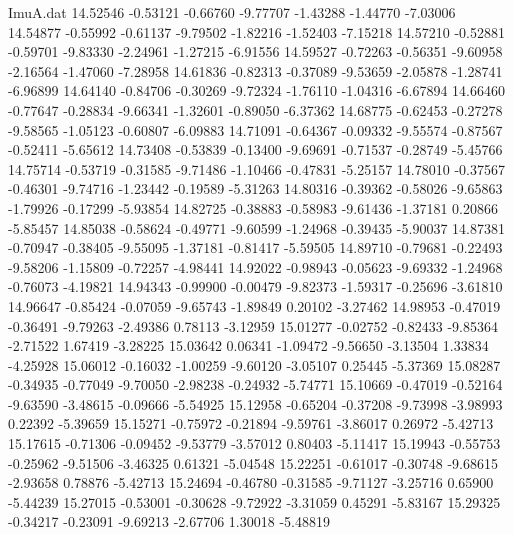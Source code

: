 \begin{filecontents}{ImuA.dat}
  14.52546   -0.53121   -0.66760   -9.77707   -1.43288   -1.44770   -7.03006
  14.54877   -0.55992   -0.61137   -9.79502   -1.82216   -1.52403   -7.15218
  14.57210   -0.52881   -0.59701   -9.83330   -2.24961   -1.27215   -6.91556
  14.59527   -0.72263   -0.56351   -9.60958   -2.16564   -1.47060   -7.28958
  14.61836   -0.82313   -0.37089   -9.53659   -2.05878   -1.28741   -6.96899
  14.64140   -0.84706   -0.30269   -9.72324   -1.76110   -1.04316   -6.67894
  14.66460   -0.77647   -0.28834   -9.66341   -1.32601   -0.89050   -6.37362
  14.68775   -0.62453   -0.27278   -9.58565   -1.05123   -0.60807   -6.09883
  14.71091   -0.64367   -0.09332   -9.55574   -0.87567   -0.52411   -5.65612
  14.73408   -0.53839   -0.13400   -9.69691   -0.71537   -0.28749   -5.45766
  14.75714   -0.53719   -0.31585   -9.71486   -1.10466   -0.47831   -5.25157
  14.78010   -0.37567   -0.46301   -9.74716   -1.23442   -0.19589   -5.31263
  14.80316   -0.39362   -0.58026   -9.65863   -1.79926   -0.17299   -5.93854
  14.82725   -0.38883   -0.58983   -9.61436   -1.37181    0.20866   -5.85457
  14.85038   -0.58624   -0.49771   -9.60599   -1.24968   -0.39435   -5.90037
  14.87381   -0.70947   -0.38405   -9.55095   -1.37181   -0.81417   -5.59505
  14.89710   -0.79681   -0.22493   -9.58206   -1.15809   -0.72257   -4.98441
  14.92022   -0.98943   -0.05623   -9.69332   -1.24968   -0.76073   -4.19821
  14.94343   -0.99900   -0.00479   -9.82373   -1.59317   -0.25696   -3.61810
  14.96647   -0.85424   -0.07059   -9.65743   -1.89849    0.20102   -3.27462
  14.98953   -0.47019   -0.36491   -9.79263   -2.49386    0.78113   -3.12959
  15.01277   -0.02752   -0.82433   -9.85364   -2.71522    1.67419   -3.28225
  15.03642    0.06341   -1.09472   -9.56650   -3.13504    1.33834   -4.25928
  15.06012   -0.16032   -1.00259   -9.60120   -3.05107    0.25445   -5.37369
  15.08287   -0.34935   -0.77049   -9.70050   -2.98238   -0.24932   -5.74771
  15.10669   -0.47019   -0.52164   -9.63590   -3.48615   -0.09666   -5.54925
  15.12958   -0.65204   -0.37208   -9.73998   -3.98993    0.22392   -5.39659
  15.15271   -0.75972   -0.21894   -9.59761   -3.86017    0.26972   -5.42713
  15.17615   -0.71306   -0.09452   -9.53779   -3.57012    0.80403   -5.11417
  15.19943   -0.55753   -0.25962   -9.51506   -3.46325    0.61321   -5.04548
  15.22251   -0.61017   -0.30748   -9.68615   -2.93658    0.78876   -5.42713
  15.24694   -0.46780   -0.31585   -9.71127   -3.25716    0.65900   -5.44239
  15.27015   -0.53001   -0.30628   -9.72922   -3.31059    0.45291   -5.83167
  15.29325   -0.34217   -0.23091   -9.69213   -2.67706    1.30018   -5.48819

\end{filecontents}
